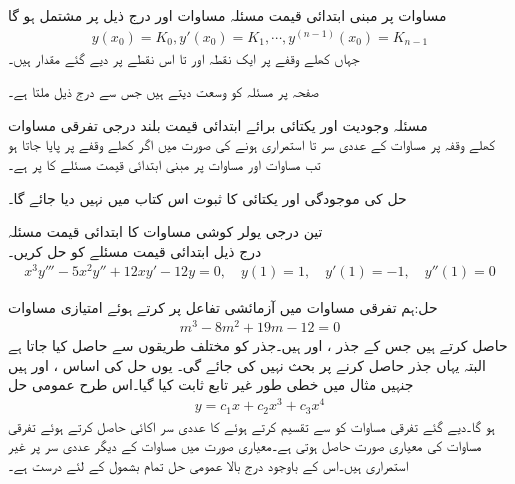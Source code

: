 مساوات  پر مبنی ابتدائی قیمت مسئلہ مساوات  اور درج ذیل   پر مشتمل ہو گا
\begin{align}\label{مساوات_سادہ+بلند_ابتدائی_شرائط}
y(x_0)=K_0, y'(x_0)=K_1,\cdots , y^{(n-1)}(x_0)=K_{n-1}
\end{align}
جہاں  کھلے وقفے  پر ایک نقطہ اور  تا  اس نقطے پر  دیے گئے مقدار ہیں۔

صفحہ  پر مسئلہ  کو وسعت دیتے ہیں جس سے درج ذیل ملتا ہے۔

\quad مسئلہ وجودیت اور یکتائی برائے ابتدائی قیمت بلند درجی  تفرقی مساوات\\
کھلے وقفہ  پر مساوات  کے عددی سر  تا  استمراری ہونے کی صورت میں اگر  کھلے وقفے پر پایا جاتا ہو تب مساوات  اور مساوات  پر مبنی ابتدائی قیمت مسئلے کا  پر     ہے۔

حل کی موجودگی اور یکتائی کا ثبوت اس کتاب میں نہیں دیا جائے گا۔

\quad تین درجی یولر کوشی مساوات کا ابتدائی قیمت مسئلہ\\
درج ذیل ابتدائی قیمت مسئلے کو حل کریں۔
\begin{align*}
x^3y'''-5x^2y''+12xy'-12y=0,\quad y(1)=1, \quad y'(1)=-1, \quad y''(1)=0
\end{align*}

حل:ہم تفرقی مساوات میں آزمائشی تفاعل  پر کرتے ہوئے امتیازی مساوات
\begin{align*}
m^3-8m^2+19m-12=0
\end{align*}
حاصل کرتے ہیں جس کے جذر ،  اور  ہیں۔جذر  کو مختلف طریقوں سے حاصل کیا جاتا ہے البتہ یہاں جذر حاصل کرنے پر بحث نہیں کی جائے گی۔ یوں حل کی اساس ،  اور  ہیں جنہیں مثال  میں خطی طور غیر تابع ثابت کیا گیا۔اس طرح عمومی حل
\begin{align*}
y=c_1x+c_2x^3+c_3x^4
\end{align*}
ہو گا۔دیے گئے تفرقی مساوات کو   سے تقسیم کرتے ہوئے  کا عددی سر اکائی حاصل کرتے ہوئے تفرقی مساوات کی معیاری صورت حاصل ہوتی ہے۔معیاری صورت میں مساوات کے دیگر عددی سر  پر غیر استمراری ہیں۔اس کے باوجود درج بالا عمومی حل تمام  بشمول   کے لئے درست ہے۔ 

